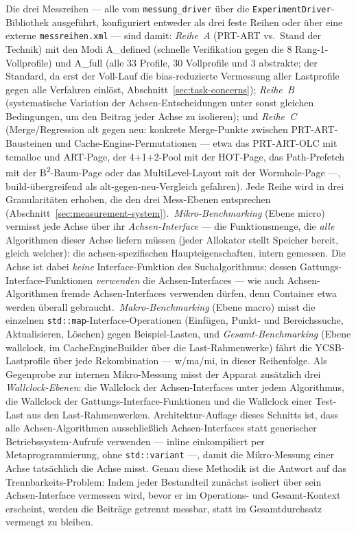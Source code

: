 \begin{nurlang}
Die drei Messreihen --- alle vom \texttt{messung\_driver} über die \texttt{ExperimentDriver}-Bibliothek
ausgeführt, konfiguriert entweder als drei feste Reihen oder über eine externe
\texttt{messreihen.xml} --- sind damit: \emph{Reihe~A} (PRT-ART vs.\ Stand der Technik) mit den Modi A\_defined
(schnelle Verifikation gegen die 8 Rang-1-Vollprofile) und A\_full (alle 33 Profile, 30 Vollprofile und 3 abstrakte; der Standard, da erst der
Voll-Lauf die bias-reduzierte Vermessung aller Lastprofile gegen alle Verfahren einlöst,
Abschnitt~\ref{sec:task-concerns}); \emph{Reihe~B} (systematische Variation der
Achsen-Entscheidungen unter sonst gleichen Bedingungen, um den Beitrag jeder Achse zu isolieren); und
\emph{Reihe~C} (Merge/Regression alt gegen neu: konkrete Merge-Punkte zwischen PRT-ART-Bausteinen und
Cache-Engine-Permutationen --- etwa das PRT-ART-OLC mit tcmalloc und ART-Page, der 4+1+2-Pool mit der
HOT-Page, das Path-Prefetch mit der B\textsuperscript{2}-Baum-Page oder das MultiLevel-Layout mit der
Wormhole-Page ---, build-übergreifend als alt-gegen-neu-Vergleich gefahren). Jede Reihe wird in
drei Granularitäten erhoben, die den drei Mess-Ebenen entsprechen
(Abschnitt~\ref{sec:measurement-system}).\ \emph{Mikro-Benchmarking} (Ebene micro) vermisst jede Achse
über ihr \emph{Achsen-Interface} --- die Funktionsmenge, die \emph{alle} Algorithmen dieser Achse liefern
müssen (jeder Allokator stellt Speicher bereit, gleich welcher): die achsen-spezifischen
Haupteigenschaften, intern gemessen. Die Achse ist dabei \emph{keine} Interface-Funktion des
Suchalgorithmus; dessen Gattungs-Interface-Funktionen \emph{verwenden} die Achsen-Interfaces ---
wie auch Achsen-Algorithmen fremde Achsen-Interfaces verwenden dürfen, denn Container etwa werden
überall gebraucht.\ \emph{Makro-Benchmarking} (Ebene macro) misst die einzelnen
\texttt{std::map}-Interface-Operationen (Einfügen, Punkt- und Bereichssuche, Aktualisieren,
Löschen) gegen Beispiel-Lasten, und \emph{Gesamt-Benchmarking} (Ebene wallclock, im CacheEngineBuilder
über die Last-Rahmenwerke) fährt die YCSB-Lastprofile über jede Rekombination --- w/ma/mi, in dieser
Reihenfolge. Als Gegenprobe zur internen Mikro-Messung misst der Apparat zusätzlich drei
\emph{Wallclock-Ebenen}: die Wallclock der Achsen-Interfaces unter jedem Algorithmus, die
Wallclock der Gattungs-Interface-Funktionen und die Wallclock einer Test-Last aus den
Last-Rahmenwerken. Architektur-Auflage dieses Schnitts ist, dass alle Achsen-Algorithmen
ausschließlich Achsen-Interfaces statt generischer Betriebssystem-Aufrufe verwenden --- inline
einkompiliert per Metaprogrammierung, ohne \texttt{std::variant} ---, damit die Mikro-Messung
einer Achse tatsächlich die Achse misst. Genau diese Methodik ist die Antwort auf das
Trennbarkeits-Problem: Indem jeder Bestandteil zunächst isoliert über sein Achsen-Interface
vermessen wird, bevor er im Operations- und Gesamt-Kontext erscheint, werden die Beiträge getrennt
messbar, statt im Gesamtdurchsatz vermengt zu bleiben.


\end{nurlang}
